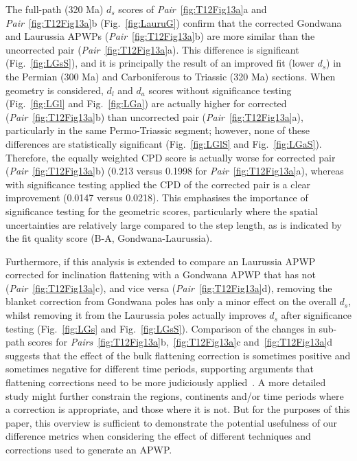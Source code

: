 The full-path (320 Ma) $d_s$ scores of
\emph{Pair}~\ref{fig:T12Fig13a}a and \emph{Pair}~\ref{fig:T12Fig13a}b
(Fig.~\ref{fig:LauruG}) confirm that the corrected Gondwana and Laurussia
APWPs (\emph{Pair}~\ref{fig:T12Fig13a}b) are more similar than the uncorrected
pair (\emph{Pair}~\ref{fig:T12Fig13a}a). This difference is significant
(Fig.~\ref{fig:LGsS}), and it is principally the result of an improved fit
(lower $d_s$) in the Permian (300 Ma) and Carboniferous to
Triassic (320 Ma) sections. When geometry is considered, $d_l$
and $d_a$ scores without significance testing (Fig.~\ref{fig:LGl} and
Fig.~\ref{fig:LGa}) are actually higher for corrected
(\emph{Pair}~\ref{fig:T12Fig13a}b) than uncorrected pair
(\emph{Pair}~\ref{fig:T12Fig13a}a), particularly in the same Permo-Triassic
segment; however, none of these differences are statistically significant
(Fig.~\ref{fig:LGlS} and Fig.~\ref{fig:LGaS}). Therefore, the equally weighted
CPD score is actually worse for corrected pair
(\emph{Pair}~\ref{fig:T12Fig13a}b) (0.213 versus 0.1998 for
\emph{Pair}~\ref{fig:T12Fig13a}a), whereas with significance testing applied the
CPD of the corrected pair is a clear improvement (0.0147 versus 0.0218). This
emphasises the importance of significance testing for the geometric scores,
particularly where the spatial uncertainties are relatively large compared to
the step length, as is indicated by the fit quality score (B-A,
Gondwana-Laurussia).

Furthermore, if this analysis is extended to compare an Laurussia APWP corrected
for inclination flattening with a Gondwana APWP that has not
(\emph{Pair}~\ref{fig:T12Fig13a}c), and vice versa
(\emph{Pair}~\ref{fig:T12Fig13a}d), removing the blanket correction from
Gondwana poles has only a minor effect on the overall $d_s$, whilst removing it
from the Laurussia poles actually improves $d_s$ after significance testing
(Fig.~\ref{fig:LGs} and Fig.~\ref{fig:LGsS}). Comparison of the changes in
sub-path scores for \emph{Pairs}~\ref{fig:T12Fig13a}b,~\ref{fig:T12Fig13a}c
and~\ref{fig:T12Fig13a}d suggests that the effect of the bulk flattening
correction is sometimes positive and sometimes negative for different time
periods, supporting arguments that flattening corrections need to be more
judiciously applied~\cite[for example]{B10,B16}. A more detailed study might
further constrain the regions, continents and/or time periods where a correction
is appropriate, and those where it is not. But for the purposes of this paper,
this overview is sufficient to demonstrate the potential usefulness of our
difference metrics when considering the effect of different techniques and
corrections used to generate an APWP\@.

